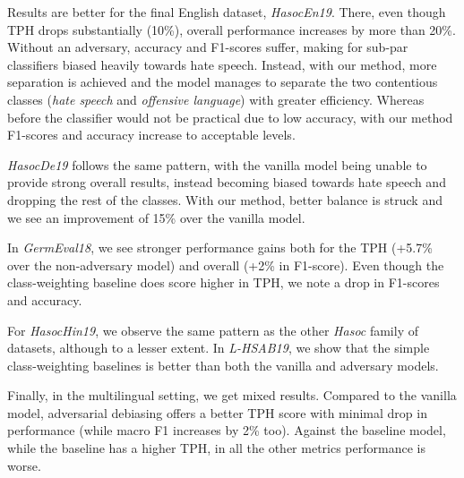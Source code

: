 \documentclass[11pt]{article}
\begin{document}
	Results are better for the final English dataset, \textit{HasocEn19}. There, even though TPH drops substantially (10\%), overall performance increases by more than 20\%. Without an adversary, accuracy and F1-scores suffer, making for sub-par classifiers biased heavily towards hate speech. Instead, with our method, more separation is achieved and the model manages to separate the two contentious classes (\textit{hate speech} and \textit{offensive language}) with greater efficiency. Whereas before the classifier would not be practical due to low accuracy, with our method F1-scores and accuracy increase to acceptable levels.
	
	\textit{HasocDe19} follows the same pattern, with the vanilla model being unable to provide strong overall results, instead becoming biased towards hate speech and dropping the rest of the classes. With our method, better balance is struck and we see an improvement of 15\% over the vanilla model.
	
	In \textit{GermEval18}, we see stronger performance gains both for the TPH (+5.7\% over the non-adversary model) and overall (+2\% in F1-score). Even though the class-weighting baseline does score higher in TPH, we note a drop in F1-scores and accuracy.
	
	For \textit{HasocHin19}, we observe the same pattern as the other \textit{Hasoc} family of datasets, although to a lesser extent. In \textit{L-HSAB19}, we show that the simple class-weighting baselines is better than both the vanilla and adversary models.
	
	Finally, in the multilingual setting, we get mixed results. Compared to the vanilla model, adversarial debiasing offers a better TPH score with minimal drop in performance (while macro F1 increases by 2\% too). Against the baseline model, while the baseline has a higher TPH, in all the other metrics performance is worse.
	
\end{document}
